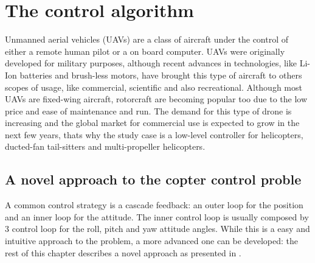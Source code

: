 \chapter{The control algorithm}
\label{ch:controlalgorithm} 
Unmanned aerial vehicles (UAVs) are a class of aircraft under the control of either a remote human pilot or a on board computer. UAVs were originally developed for military purposes, although recent advances in technologies, like Li-Ion batteries and brush-less motors, have brought this type of aircraft to  others scopes of usage, like commercial, scientific and also recreational.
Although most UAVs are fixed-wing aircraft, rotorcraft are becoming popular too due to the low price and ease of maintenance and run. The demand for this type of drone is increasing and the global market for commercial use is expected to grow in the next few years, thats why the study case is a low-level controller for helicopters, ducted-fan tail-sitters and multi-propeller helicopters.

\section{A novel approach to the copter control proble}
A common control strategy is a cascade feedback: an outer loop for the position and an inner loop for the attitude. The inner control loop is usually composed by 3 control loop for the roll, pitch and yaw attitude angles. While this is a easy and intuitive approach to the problem, a more advanced one can be developed: the rest of this chapter describes a novel approach as presented in \autocite{marconi}.

